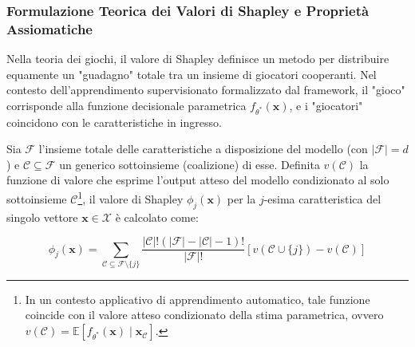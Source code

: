 \subsubsection{Formulazione Teorica dei Valori di Shapley e Proprietà Assiomatiche}
\label{subsubsec:shap_teoria}

Nella teoria dei giochi, il valore di Shapley definisce un metodo per distribuire equamente un "guadagno" totale tra un insieme di giocatori cooperanti. Nel contesto dell'apprendimento supervisionato formalizzato dal framework, il "gioco" corrisponde alla funzione decisionale parametrica $f_{\theta^*}(\mathbf{x})$, e i "giocatori" coincidono con le caratteristiche in ingresso.
        
Sia $\mathcal{F}$ l'insieme totale delle caratteristiche a disposizione del modello (con $|\mathcal{F}| = d$) e $\mathcal{C} \subseteq \mathcal{F}$ un generico sottoinsieme (coalizione) di esse. Definita $v(\mathcal{C})$ la funzione di valore che esprime l'output atteso del modello condizionato al solo sottoinsieme $\mathcal{C}$\footnote{In un contesto applicativo di apprendimento automatico, tale funzione coincide con il valore atteso condizionato della stima parametrica, ovvero $v(\mathcal{C}) = \mathbb{E}[f_{\theta^*}(\mathbf{x}) \mid \mathbf{x}_{\mathcal{C}}]$.}, il valore di Shapley $\phi_j(\mathbf{x})$ per la $j$-esima caratteristica del singolo vettore $\mathbf{x} \in \mathcal{X}$ è calcolato come:

\begin{equation}
    \phi_j(\mathbf{x}) = \sum_{\mathcal{C} \subseteq \mathcal{F} \setminus \{j\}} \frac{|\mathcal{C}|!(|\mathcal{F}| - |\mathcal{C}| - 1)!}{|\mathcal{F}|!} \left[ v(\mathcal{C} \cup \{j\}) - v(\mathcal{C}) \right]
\end{equation}

